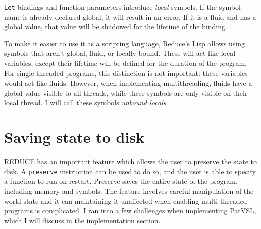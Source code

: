 \texttt{Let} bindings and function parameters introduce \emph{local} symbols. If the symbol name is already declared global,
it will result in an error. If it is a fluid and has a global value, that value will be shadowed for the lifetime
of the binding.

To make it easier to use it as a scripting language, Reduce's Lisp allows using symbols that aren't global, fluid,
or locally bound. These will act like local variables, except their lifetime will be defined for the duration of the
program. For single-threaded programs, this distinction is not important: these variables would act like fluids. However,
when implementing multithreading, fluids have a global value visible to all threads, while these symbols are only
visible on their local thread. I will call these symbols \emph{unbound locals}.

\section{Saving state to disk}
REDUCE has an important feature which allows the user to preserve the state to disk. A \texttt{preserve} instruction can be
used to do so, and the user is able to specify a function to run on restart. Preserve saves the entire state of the
program, including memory and symbols. The feature involves careful manipulation of the world state and it can maintaining
it unaffected when enabling multi-threaded programs is complicated. I ran into a few challenges when implementing ParVSL,
which I will discuss in the implementation section.
